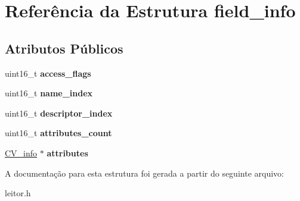 \hypertarget{structfield__info}{\section{Referência da Estrutura field\-\_\-info}
\label{structfield__info}
}
\subsection*{Atributos Públicos}
\begin{DoxyCompactItemize}
\item 
\hypertarget{structfield__info_a97bcc8f6647cee71ea02bdd4183ba1da}{uint16\-\_\-t {\bfseries access\-\_\-flags}}\label{structfield__info_a97bcc8f6647cee71ea02bdd4183ba1da}

\item 
\hypertarget{structfield__info_a3041f6a85347269c5253f7d377384b06}{uint16\-\_\-t {\bfseries name\-\_\-index}}\label{structfield__info_a3041f6a85347269c5253f7d377384b06}

\item 
\hypertarget{structfield__info_a56345eae0135047540b60ca34c91eb46}{uint16\-\_\-t {\bfseries descriptor\-\_\-index}}\label{structfield__info_a56345eae0135047540b60ca34c91eb46}

\item 
\hypertarget{structfield__info_a26aebef0abc97afef9e9a34701e6b550}{uint16\-\_\-t {\bfseries attributes\-\_\-count}}\label{structfield__info_a26aebef0abc97afef9e9a34701e6b550}

\item 
\hypertarget{structfield__info_abc01ba577951ede3541419f54337b02b}{\hyperlink{structConstantValue__attribute}{C\-V\-\_\-info} $\ast$ {\bfseries attributes}}\label{structfield__info_abc01ba577951ede3541419f54337b02b}

\end{DoxyCompactItemize}


A documentação para esta estrutura foi gerada a partir do seguinte arquivo\-:\begin{DoxyCompactItemize}
\item 
leitor.\-h\end{DoxyCompactItemize}
